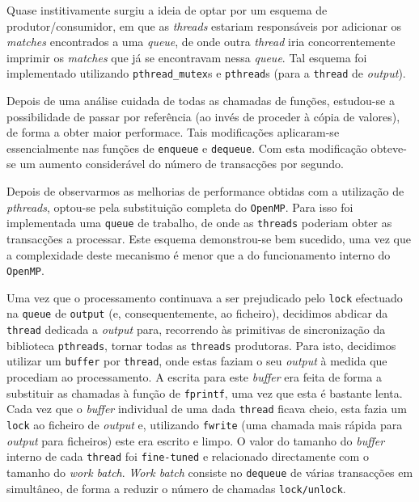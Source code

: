 \documentclass[a4paper]{article}
\begin{document}
Quase institivamente surgiu a ideia de optar por um esquema de produtor/consumidor, em que as \textit{threads} estariam responsáveis por adicionar os \textit{matches} encontrados a uma \textit{queue}, de onde outra \textit{thread} iria concorrentemente imprimir os \textit{matches} que já se encontravam nessa \textit{queue}. Tal esquema foi implementado utilizando \texttt{pthread\_mutex}s e \texttt{pthread}s (para a \texttt{thread} de \textit{output}).

Depois de uma análise cuidada de todas as chamadas de funções, estudou-se a possibilidade de passar por referência (ao invés de proceder à cópia de valores), de forma a obter maior performace. Tais modificações aplicaram-se essencialmente nas funções de \texttt{enqueue} e \texttt{dequeue}. Com esta modificação obteve-se um aumento considerável do número de transacções por segundo.

Depois de observarmos as melhorias de performance obtidas com a utilização de \textit{pthreads}, optou-se pela substituição completa do \texttt{OpenMP}. Para isso foi implementada uma \texttt{queue} de trabalho, de onde as \texttt{threads} poderiam obter as transacções a processar. Este esquema demonstrou-se bem sucedido, uma vez que a complexidade deste mecanismo é menor que a do funcionamento interno do \texttt{OpenMP}.

Uma vez que o processamento continuava a ser prejudicado pelo \texttt{lock} efectuado na \texttt{queue} de \texttt{output} (e, consequentemente, ao ficheiro), decidimos abdicar da \texttt{thread} dedicada a \textit{output} para, recorrendo às primitivas de sincronização da biblioteca \texttt{pthreads}, tornar todas as \texttt{threads} produtoras. Para isto, decidimos utilizar um \texttt{buffer} por \texttt{thread}, onde estas faziam o seu \textit{output} à medida que procediam ao processamento. A escrita para este \textit{buffer} era feita de forma a substituir as chamadas à função de \texttt{fprintf}, uma vez que esta é bastante lenta. Cada vez que o \textit{buffer} individual de uma dada \texttt{thread} ficava cheio, esta fazia um \texttt{lock} ao ficheiro de \textit{output} e, utilizando \texttt{fwrite} (uma chamada mais rápida para \textit{output} para ficheiros) este era escrito e limpo. O valor do tamanho do \textit{buffer} interno de cada \texttt{thread} foi \texttt{fine-tuned} e relacionado directamente com o tamanho do \textit{work batch}. \textit{Work batch} consiste no \texttt{dequeue} de várias transacções em simultâneo, de forma a reduzir o número de chamadas \texttt{lock/unlock}.
\end{document}
